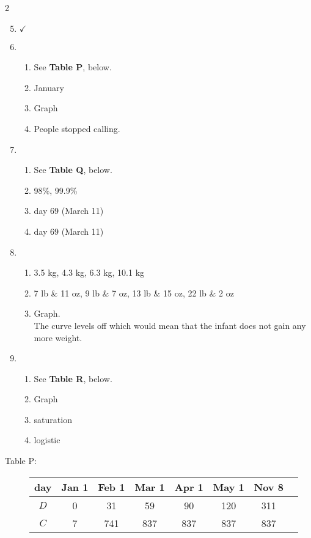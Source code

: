 \begin{multicols} {2}
\begin{enumerate}
\setcounter{enumi}{4}

\item %
$\checkmark$

\item %
\begin{enumerate}
\item See \textbf{Table P}, below.
\item January
\item Graph
\item People stopped calling.
\end{enumerate}

\item %
\begin{enumerate}
\item See \textbf{Table Q}, below.
\item 98\%, 99.9\%
\item day 69 (March 11)
\item day 69 (March 11)
\end{enumerate}

\item %
\begin{enumerate}
\item 3.5 kg, 4.3 kg, 6.3 kg, 10.1 kg
\item 7 lb \& 11 oz, 9 lb \& 7 oz, 13 lb \& 15 oz, 22 lb \& 2 oz
\item Graph. \\ The curve levels off which would mean that the infant does not gain any more weight.
\end{enumerate}

\item%
\begin{enumerate}
\item See \textbf{Table R}, below.
\item Graph
\item saturation
\item logistic
\end{enumerate}



\end{enumerate}
\end{multicols}

\bigskip

\begin{description}
\item[\quad Table P: \quad] 
\begin{tabular} {|c| |c|c |c|c |c|c |c|}\hline
day & Jan 1 & Feb 1 & Mar 1 & Apr 1 & May 1 & Nov 8 \\ \hline
$D$ & 0 & 31 & 59 & 90 & 120 & 311\\ \hline
$C$ & 7 & 741 & 837 & 837 & 837 & 837  \\ \hline
\end{tabular}
\end{description}

